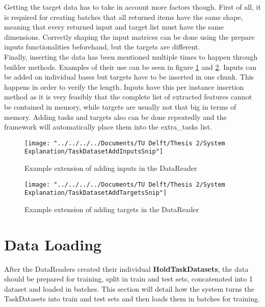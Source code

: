 
Getting the target data has to take in account more factors though. First of all, it is required for creating batches that all returned items have the same shape, meaning that every returned input and target list must have the same dimensions. Correctly shaping the input matrices can be done using the prepare inputs functionalities beforehand, but the targets are different. \\

Finally, inserting the data has been mentioned multiple times to happen through builder methods. Examples of their use can be seen in figure \ref{fig:taskdatasetaddinputssnip} and \ref{fig:taskdatasetaddtargetssnip}. Inputs can be added on individual bases but targets have to be inserted in one chunk. This happens in order to verify the length. Inputs have this per instance insertion method as it is very feasibly that the complete list of extracted features cannot be contained in memory, while targets are usually not that big in terms of memory. Adding tasks and targets also can be done repeatedly and the framework will automatically place them into the extra\_tasks list.\\

\begin{figure}
	\centering
	\texttt{[image: "../../../../Documents/TU Delft/Thesis 2/System Explanation/TaskDatasetAddInputsSnip"]}
	\caption{Example extension of adding inputs in the DataReader}
	\label{fig:taskdatasetaddinputssnip}
\end{figure}

\begin{figure}
	\centering
	\texttt{[image: "../../../../Documents/TU Delft/Thesis 2/System Explanation/TaskDatasetAddTargetsSnip"]}
	\caption{Example extension of adding targets in the DataReader}
	\label{fig:taskdatasetaddtargetssnip}
\end{figure}


\section{Data Loading} \label{Impl:DataLoad}

After the DataReaders created their individual \textbf{HoldTaskDatasets}, the data should be prepared for training, split in train and test sets, concatenated into 1 dataset and loaded in batches.  This section will detail how the system turns the TaskDatasets into train and test sets and then loads them in batches for training. \\

